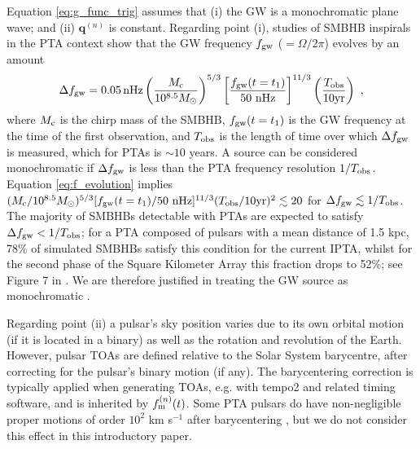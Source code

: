 \documentclass[fleqn,usenatbib,useAMS]{mnras}
\begin{document}
\noindent Equation \eqref{eq:g_func_trig} assumes that (i) the GW is a monochromatic plane wave; and (ii) $\boldsymbol{q}^{(n)}$ is constant. Regarding point (i), studies of SMBHB inspirals in the PTA context show that the GW frequency $f_{\rm gw}$ ($=\Omega / 2 \pi $) evolves by an amount \citep[e.g.][]{Sesana2010}
\begin{equation}
	\Delta f_{\rm gw} = 0.05 \, \mathrm{nHz}\left(\frac{M_{\rm c}}{10^{8.5} M_{\odot}}\right)^{5 / 3}\left[\frac{f_{\rm gw}(t=t_1)}{50 \mathrm{~nHz}}\right]^{11 / 3}\left(\frac{T_{\mathrm{obs}}}{10 \mathrm{yr}}\right) \ ,
	\label{eq:f_evolution}
\end{equation}
where $M_{\rm c}$ is the chirp mass of the SMBHB, $f_{\rm gw}(t=t_1)$ is the GW frequency at the time of the first observation, and $T_{\rm obs}$ is the length of time over which $\Delta f_{\rm gw}$ is measured, which for PTAs is $\sim 10$ years. A source can be considered monochromatic if $\Delta f_{\rm gw}$ is less than the PTA frequency resolution $1/T_{\rm obs}$. Equation \eqref{eq:f_evolution} implies $(M_{\rm c}/10^{8.5} M_{\odot})^{5/3} [ f_{\rm gw}(t=t_1) / 50 \mathrm{~nHz}]^{11/3} (T_{\rm obs}/10 \mathrm{yr})^2 \lesssim 20$ for $\Delta f_{\rm gw} \lesssim 1/T_{\rm obs}$. The majority of SMBHBs detectable with PTAs are expected to satisfy $\Delta f_{\rm gw} < 1/T_{\rm obs}$; for a PTA composed of pulsars with a mean distance of 1.5 kpc, 78\% of simulated SMBHBs satisfy this condition for the current IPTA, whilst for the second phase of the Square Kilometer Array this fraction drops to 52\%; see Figure 7 in  \cite{Rosado10.1093/mnras/stv1098}. We are therefore justified in treating the GW source as monochromatic \citep{Sesana10,Sesana2010,Ellis2012ApJ}. \newline 


Regarding point (ii) a pulsar's sky position varies due to its own orbital motion (if it is located in a binary) as well as the rotation and revolution of the Earth. However, pulsar TOAs are defined relative to the Solar System barycentre, after correcting for the pulsar's binary motion (if any). The barycentering correction is typically applied when generating TOAs, e.g. with {\sc tempo2} \citep{tempo2,edwardstempo} and related timing software, and is inherited by $f_{\rm m}^{(n)}(t)$. Some PTA pulsars do have non-negligible proper motions of order $10^2$ km s$^{-1}$ after barycentering \citep[e.g.][]{10.1093/mnras/sty3390}, but we do not consider this effect in this introductory paper. 
\end{document}
